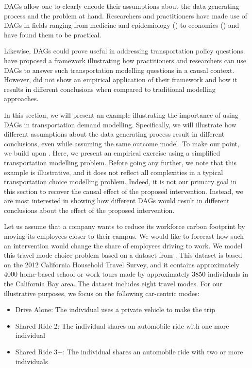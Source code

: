DAGs allow one to clearly encode their assumptions about the data generating process and the problem at hand.
Researchers and practitioners have made use of DAGs in fields ranging from medicine and epidemiology (\citet{shrier_2008_reducing, sung_2012_reducing}) to economics (\citet{white_2011_covariate}) and have found them to be practical.

Likewise, DAGs could prove useful in addressing transportation policy questions.
\citet{brathwaite_2018_causal} have proposed a framework illustrating how practitioners and researchers can use DAGs to answer such transportation modelling questions in a causal context.
However, \citet{brathwaite_2018_causal} did not show an empirical application of their framework and how it results in different conclusions when compared to traditional modelling approaches.

In this section, we will present an example illustrating the importance of using DAGs in transportation demand modelling.
Specifically, we will illustrate how different assumptions about the data generating process result in different conclusions, even while assuming the same outcome model.
To make our point, we build upon \citet{brathwaite_2018_causal}.
Here, we present an empirical exercise using a simplified transportation modelling problem.
Before going any further, we note that this example is illustrative, and it does not reflect all complexities in a typical transportation choice modelling problem.
Indeed, it is not our primary goal in this section to recover the causal effect of the proposed intervention.
Instead, we are most interested in showing how different DAGs would result in different conclusions about the effect of the proposed intervention.

Let us assume that a company wants to reduce its workforce carbon footprint by moving its employees closer to their campus.
We would like to forecast how such an intervention would change the share of employees driving to work.
We model this travel mode choice problem based on a dataset from \citet{brathwaite_asymmetric}.
This dataset is based on the 2012 California Household Travel Survey, and it
contains approximately 4000 home-based school or work tours made by approximately 3850 individuals in the California Bay area.
The dataset includes eight travel modes.
For our illustrative purposes, we focus on the following car-centric modes:

\begin{itemize}
   \item Drive Alone: The individual uses a private vehicle to make the trip
   \item Shared Ride 2: The individual shares an automobile ride with one more individual
   \item Shared Ride 3+: The individual shares an automobile ride with two or more individuals
\end{itemize}

